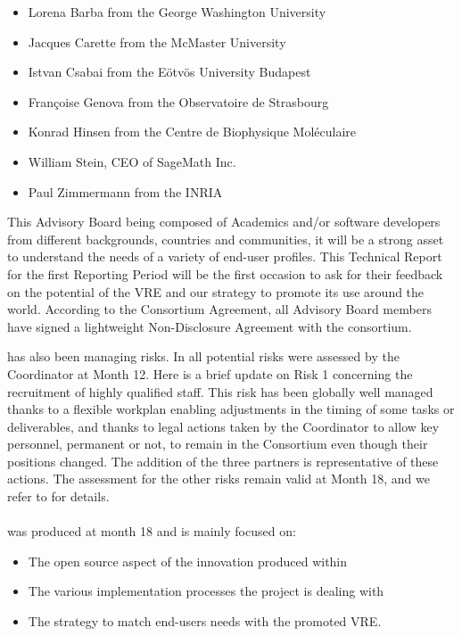 \documentclass{deliverablereport}
\begin{document}
\begin{itemize}
\item{Lorena Barba from the George Washington University}
\item{Jacques Carette from the McMaster University}
\item{Istvan Csabai from the Eötvös University Budapest}
\item{Françoise Genova from the Observatoire de Strasbourg}
\item{Konrad Hinsen from the Centre de Biophysique Moléculaire}
\item{William Stein, CEO of SageMath Inc.}
\item{Paul Zimmermann from the INRIA}
\end{itemize}

This Advisory Board being composed of Academics and/or software
developers from different backgrounds, countries and communities, it
will be a strong asset to understand the needs of a variety of
end-user profiles. This Technical Report for the first Reporting
Period will be the first occasion to ask for their feedback on the
potential of the VRE and our strategy to promote its use around the
world. According to the Consortium Agreement, all Advisory Board
members have signed a lightweight Non-Disclosure Agreement with the
consortium.

 has also been managing risks. In 
all potential risks were assessed by the Coordinator at Month 12. Here
is a brief update on Risk 1 concerning the recruitment of highly
qualified staff. This risk has been globally well managed thanks to a
flexible workplan enabling adjustments in the timing of some tasks or
deliverables, and thanks to legal actions taken by the Coordinator to
allow key personnel, permanent or not, to remain in the Consortium
even though their positions changed. The addition of the three
partners is representative of these actions. The assessment for the
other risks remain valid at Month 18, and we refer to
 for details.

\paragraph{}

 was produced at month 18 and is mainly focused on: 

\begin{itemize}
\item{The open source aspect of the innovation produced within \ODK}
\item{The various implementation processes the project is dealing with}
\item{The strategy to match end-users needs with the promoted VRE}.
\end{itemize}
\end{document}
